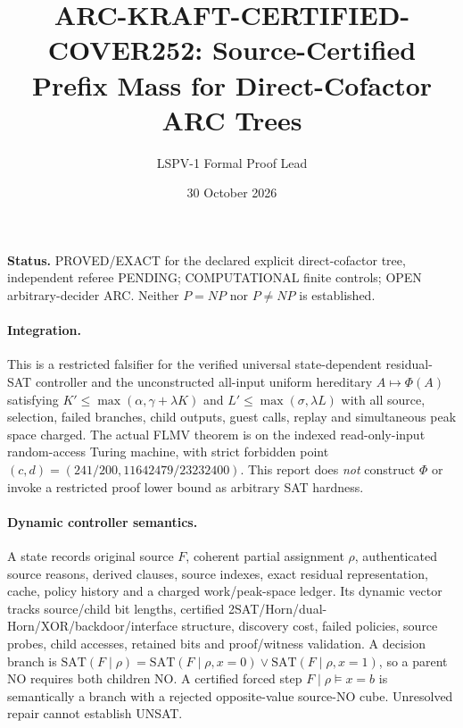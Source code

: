 \documentclass[11pt]{article}
\title{ARC-KRAFT-CERTIFIED-COVER252: Source-Certified Prefix Mass for Direct-Cofactor ARC Trees}
\author{LSPV-1 Formal Proof Lead}
\date{30 October 2026}
\begin{document}
\maketitle
\noindent\textbf{Status.} PROVED/EXACT for the declared explicit direct-cofactor tree, independent referee PENDING; COMPUTATIONAL finite controls; OPEN arbitrary-decider ARC. Neither $P=NP$ nor $P\ne NP$ is established.

\paragraph{Integration.}
This is a restricted falsifier for the verified universal state-dependent residual-SAT controller and the unconstructed all-input uniform hereditary $A\mapsto\Phi(A)$ satisfying
$K'\le\max(\alpha,\gamma+\lambda K)$ and $L'\le\max(\sigma,\lambda L)$ with all source, selection, failed branches, child outputs, guest calls, replay and simultaneous peak space charged.
The actual FLMV theorem is on the indexed read-only-input random-access Turing machine, with strict forbidden point $(c,d)=(241/200,11642479/23232400)$. This report does \emph{not} construct $\Phi$ or invoke a restricted proof lower bound as arbitrary SAT hardness.

\paragraph{Dynamic controller semantics.}
A state records original source $F$, coherent partial assignment $\rho$, authenticated source reasons, derived clauses, source indexes, exact residual representation, cache, policy history and a charged work/peak-space ledger. Its dynamic vector tracks source/child bit lengths, certified 2SAT/Horn/dual-Horn/XOR/backdoor/interface structure, discovery cost, failed policies, source probes, child accesses, retained bits and proof/witness validation. A decision branch is $\mathrm{SAT}(F\mid\rho)=\mathrm{SAT}(F\mid\rho,x=0)\lor\mathrm{SAT}(F\mid\rho,x=1)$, so a parent NO requires both children NO. A certified forced step $F\mid\rho\models x=b$ is semantically a branch with a rejected opposite-value source-NO cube. Unresolved repair cannot establish UNSAT.
\end{document}
